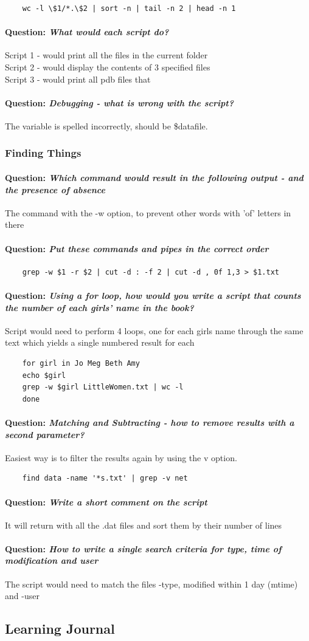 \documentclass[12pt]{article}
\newcommand{\question}[1]{\paragraph{Question: {\textnormal{\textit{#1}}} ~\\}}
\begin{document}
\begin{verbatim}
    wc -l \$1/*.\$2 | sort -n | tail -n 2 | head -n 1
\end{verbatim}

\question{What would each script do?}
Script 1 - would print all the files in the current folder\\
Script 2 - would display the contents of 3 specified files \\
Script 3 - would print all pdb files that

\question{Debugging - what is wrong with the script?}
The variable is spelled incorrectly, should be \$datafile.

\subsubsection{Finding Things}
\question{Which command would result in the following output - and the presence of absence}

The command with the -w option, to prevent other words with 'of' letters in there
\question{Put these commands and pipes in the correct order}
\begin{verbatim}
    grep -w $1 -r $2 | cut -d : -f 2 | cut -d , 0f 1,3 > $1.txt
\end{verbatim}

\question{Using a for loop, how would you write a script that counts the number of each girls' name in the book?}
Script would need to perform 4 loops, one for each girls name through the same text which yields a single numbered result for each
\begin{verbatim}
    for girl in Jo Meg Beth Amy
    echo $girl
    grep -w $girl LittleWomen.txt | wc -l
    done
\end{verbatim}

\question{Matching and Subtracting - how to remove results with a second parameter?}
Easiest way is to filter the results again by using the v option.
\begin{verbatim}
    find data -name '*s.txt' | grep -v net
\end{verbatim}

\question{Write a short comment on the script}
It will return with all the .dat files and sort them by their number of lines 

\question{How to write a single search criteria for type, time of modification and user}
The script would need to match the files -type, modified within 1 day (mtime) and -user
\subsection{Learning Journal}
\end{document}
